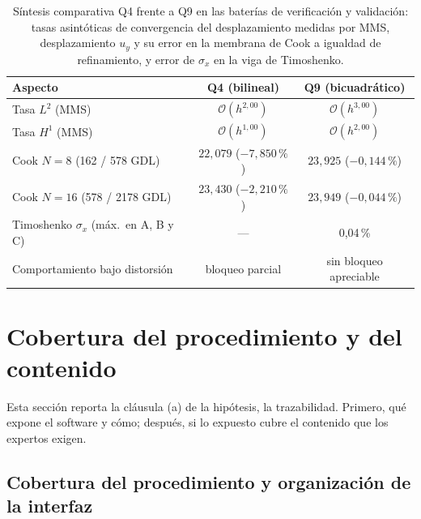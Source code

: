 \begin{table}[htbp]
\centering
\caption[Síntesis comparativa Q4 frente a Q9 en las baterías de verificación y validación.]{Síntesis comparativa Q4 frente a Q9 en las baterías de verificación y validación: tasas asintóticas de convergencia del desplazamiento medidas por MMS, desplazamiento $u_y$ y su error en la membrana de Cook a igualdad de refinamiento, y error de $\sigma_x$ en la viga de Timoshenko.}
\label{tab:resumen-q4q9}
\begin{tabular}{l c c}
\hline
Aspecto & Q4 (bilineal) & Q9 (bicuadrático) \\
\hline
Tasa $L^2$ (MMS)              & $\mathcal{O}(h^{2{,}00})$ & $\mathcal{O}(h^{3{,}00})$ \\
Tasa $H^1$ (MMS)              & $\mathcal{O}(h^{1{,}00})$ & $\mathcal{O}(h^{2{,}00})$ \\
Cook $N=8$ (162 / 578 GDL)    & $22{,}079$ ($-7{,}850\,\%$) & $23{,}925$ ($-0{,}144\,\%$) \\
Cook $N=16$ (578 / 2178 GDL)  & $23{,}430$ ($-2{,}210\,\%$) & $23{,}949$ ($-0{,}044\,\%$) \\
Timoshenko $\sigma_x$ (máx.\ en A, B y C) & --- & 0,04\,\% \\
Comportamiento bajo distorsión & bloqueo parcial & sin bloqueo apreciable \\
\hline
\end{tabular}
{\singlespacing{}}
\end{table}

\section{Cobertura del procedimiento y del contenido}
\label{sec:cobertura}

Esta sección reporta la cláusula (a) de la hipótesis, la trazabilidad. Primero, qué expone el software y cómo; después, si lo expuesto cubre el contenido que los expertos exigen.

\subsection{Cobertura del procedimiento y organización de la interfaz}
\label{sec:cobertura-canal}

